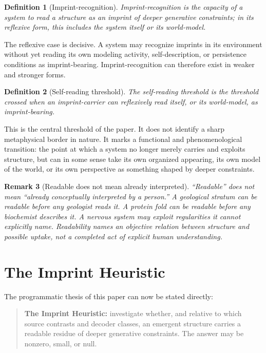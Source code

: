 \documentclass[12pt,a4paper]{article}
\newtheorem{definition}{Definition}[section]
\newtheorem{remark}[definition]{Remark}
\begin{document}
\begin{definition}[Imprint-recognition]
\emph{Imprint-recognition} is the capacity of a system to read a structure as an imprint of deeper generative constraints; in its reflexive form, this includes the system itself or its world-model.
\end{definition}

The reflexive case is decisive. A system may recognize imprints in its environment without yet reading its own modeling activity, self-description, or persistence conditions as imprint-bearing. Imprint-recognition can therefore exist in weaker and stronger forms.

\begin{definition}[Self-reading threshold]
The \emph{self-reading threshold} is the threshold crossed when an imprint-carrier can reflexively read itself, or its world-model, as imprint-bearing.
\end{definition}

This is the central threshold of the paper. It does not identify a sharp metaphysical border in nature. It marks a functional and phenomenological transition: the point at which a system no longer merely carries and exploits structure, but can in some sense take its own organized appearing, its own model of the world, or its own perspective as something shaped by deeper constraints.

\begin{remark}[Readable does not mean already interpreted]
``Readable'' does not mean ``already conceptually interpreted by a person.'' A geological stratum can be readable before any geologist reads it. A protein fold can be readable before any biochemist describes it. A nervous system may exploit regularities it cannot explicitly name. Readability names an objective relation between structure and possible uptake, not a completed act of explicit human understanding.
\end{remark}

\section{The Imprint Heuristic}

The programmatic thesis of this paper can now be stated directly:

\begin{quote}
\textbf{The Imprint Heuristic:} investigate whether, and relative to
which source contrasts and decoder classes, an emergent structure carries
a readable residue of deeper generative constraints. The answer may be
nonzero, small, or null.
\end{quote}
\end{document}
